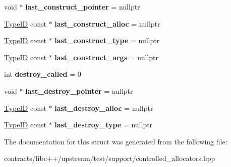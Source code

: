\begin{DoxyCompactItemize}
void $\ast$ {\bfseries last\+\_\+construct\+\_\+pointer} = nullptr
\item 
\mbox{\label{struct_alloc_controller_a9f1b797d1fae3e7e0e80326e15da60a0}} 
\mbox{\hyperlink{struct_type_i_d}{Type\+ID}} const  $\ast$ {\bfseries last\+\_\+construct\+\_\+alloc} = nullptr
\item 
\mbox{\label{struct_alloc_controller_a73710d6b03ec5747c858bd41fc8e3b41}} 
\mbox{\hyperlink{struct_type_i_d}{Type\+ID}} const  $\ast$ {\bfseries last\+\_\+construct\+\_\+type} = nullptr
\item 
\mbox{\label{struct_alloc_controller_abaaeca1746ee594a702601e005304a7b}} 
\mbox{\hyperlink{struct_type_i_d}{Type\+ID}} const  $\ast$ {\bfseries last\+\_\+construct\+\_\+args} = nullptr
\item 
\mbox{\label{struct_alloc_controller_ae5a1cba6cb02b054e8d10f01c483c0e7}} 
int {\bfseries destroy\+\_\+called} = 0
\item 
\mbox{\label{struct_alloc_controller_aead8037891294d5cf6dcff0347e5b12d}} 
void $\ast$ {\bfseries last\+\_\+destroy\+\_\+pointer} = nullptr
\item 
\mbox{\label{struct_alloc_controller_a8227cfdde5c9e75ffc37790df2c87b54}} 
\mbox{\hyperlink{struct_type_i_d}{Type\+ID}} const  $\ast$ {\bfseries last\+\_\+destroy\+\_\+alloc} = nullptr
\item 
\mbox{\label{struct_alloc_controller_a11ce84e231312194f400d5d9632c820f}} 
\mbox{\hyperlink{struct_type_i_d}{Type\+ID}} const  $\ast$ {\bfseries last\+\_\+destroy\+\_\+type} = nullptr
\end{DoxyCompactItemize}


The documentation for this struct was generated from the following file\+:\begin{DoxyCompactItemize}
\item 
contracts/libc++/upstream/test/support/controlled\+\_\+allocators.\+hpp\end{DoxyCompactItemize}
